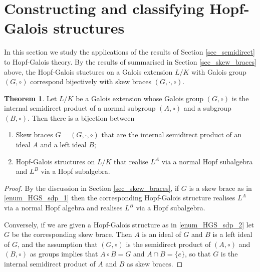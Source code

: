 \documentclass[12pt,a4paper, reqno]{amsart}
\theoremstyle{definition}
\newtheorem{theorem}{Theorem}[section]
\begin{document}
\section{Constructing and classifying Hopf-Galois structures} \label{sec_examples}

In this section we study the applications of the results of Section \ref{sec_semidirect} to Hopf-Galois theory. By the results of \cite{ST23} summarised in Section \ref{sec_skew_braces} above, the Hopf-Galois stuctures on a Galois extension $ L/K $ with Galois group $ (G,\circ) $ correspond bijectively with skew braces $ (G,\cdot,\circ) $. 

\begin{theorem} \label{thm_examples_SB_HGS}
Let $ L/K $ be a Galois extension whose Galois group $ (G,\circ) $ is the internal semidirect product of a normal subgroup $ (A,\circ) $ and a subgroup $ (B,\circ) $. Then there is a bijection between
\begin{enumerate}
\item \label{enum_HGS_sdp_1} Skew braces $ G=(G,\cdot,\circ) $ that are the internal semidirect product of an ideal $ A $ and a left ideal $ B $;
\item \label{enum_HGS_sdp_2} Hopf-Galois structures on $ L/K $ that realise $ L^{A} $ via a normal Hopf subalgebra and $ L^{B} $ via a Hopf subalgebra. 
\end{enumerate}
\end{theorem}
\begin{proof}
By the discussion in Section \ref{sec_skew_braces}, if $ G $ is a skew brace as in \ref{enum_HGS_sdp_1} then the corresponding Hopf-Galois structure realises $ L^{A} $ via a normal Hopf algebra and realises $ L^{B} $ via a Hopf subalgebra.

Conversely, if we are given a Hopf-Galois structure as in \ref{enum_HGS_sdp_2} let $ G $ be the corresponding skew brace. Then $ A $ is an ideal of $ G $ and $ B $ is a left ideal of $ G $, and the assumption that $ (G,\circ) $ is the semidirect product of $ (A,\circ) $ and $ (B,\circ) $ as groups implies that $ A \circ B = G $ and $ A \cap B = \{ e \} $, so that $ G $ is the internal semidirect product of $ A $ and $ B $ as skew braces. 
\end{proof}
\end{document}
